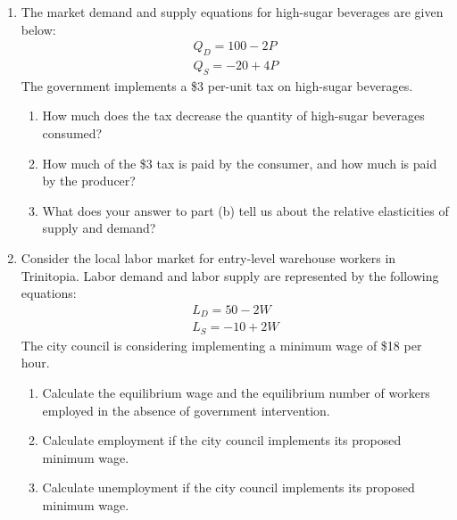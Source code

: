 \documentclass{article}
\begin{document}
\begin{enumerate}
\item The market demand and supply equations for high-sugar beverages are given below:
	\begin{gather*}
	Q_D = 100 - 2P \\
	Q_S = -20 + 4P
	\end{gather*}
	The government implements a \$3 per-unit tax on high-sugar beverages. 
	
	\begin{enumerate}
	
	\item How much does the tax decrease the quantity of high-sugar beverages consumed?
	
	\item How much of the \$3 tax is paid by the consumer, and how much is paid by the producer?
	
	\item What does your answer to part (b) tell us about the relative elasticities of supply and demand?
	
	\end{enumerate}

\item Consider the local labor market for entry-level warehouse workers in Trinitopia. Labor demand and labor supply are represented by the following equations:
	\begin{gather*}
	L_D = 50 - 2W \\
	L_S = -10 + 2W
	\end{gather*}
	The city council is considering implementing a minimum wage of \$18 per hour.
	\begin{enumerate}
	
	\item Calculate the equilibrium wage and the equilibrium number of workers employed in the absence of government intervention.
	
	\item Calculate employment if the city council implements its proposed minimum wage.
	
	\item Calculate unemployment if the city council implements its proposed minimum wage.
	
	\end{enumerate}

\end{enumerate}
\end{document}
